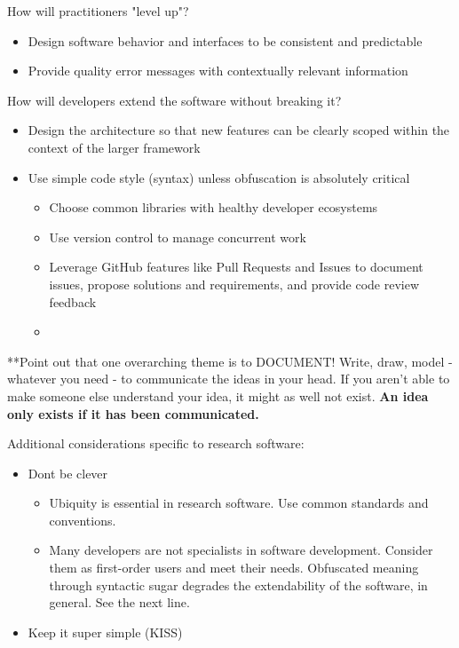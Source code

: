 \documentclass[]{nrel}
\begin{document}
How will practitioners "level up"?
\begin{itemize}
\item Design software behavior and interfaces to be consistent and predictable

\item Provide quality error messages with contextually relevant information

\end{itemize}

How will developers extend the software without breaking it?
\begin{itemize}
\item Design the architecture so that new features can be clearly scoped within the context of
the larger framework

\item Use simple code style (syntax) unless obfuscation is absolutely critical
\begin{itemize}
\item Choose common libraries with healthy developer ecosystems

\item Use version control to manage concurrent work

\item Leverage GitHub features like Pull Requests and Issues to document issues, propose
solutions and requirements, and provide code review feedback

\item \end{itemize}

\end{itemize}

**Point out that one overarching theme is to DOCUMENT! Write, draw, model - whatever you need - to
communicate the ideas in your head. If you aren’t able to make someone else understand your idea,
it might as well not exist.
\textbf{An idea only exists if it has been communicated.}

Additional considerations specific to research software:
\begin{itemize}
\item Dont be clever
\begin{itemize}
\item Ubiquity is essential in research software. Use common standards and conventions.

\item Many developers are not specialists in software development. Consider them as first-order
users and meet their needs. Obfuscated meaning through syntactic sugar degrades the
extendability of the software, in general. See the next line.

\end{itemize}

\item Keep it super simple (KISS)

\end{itemize}
\end{document}
